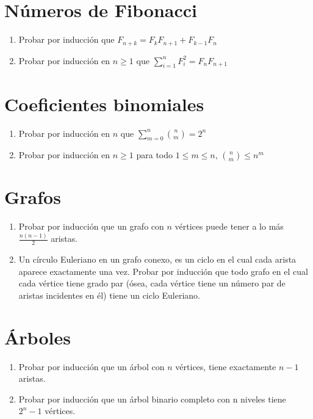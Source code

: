 \documentclass{article}
\begin{document}
\section{Números de Fibonacci} 

\begin{enumerate}
  \item Probar por inducción que $F_{n+k}=F_{k}F_{n+1}+F_{k-1}F_{n}$
  
  \item Probar por inducción en $n\geq 1$ que $\sum_{i=1}^{n}F_i^2=F_{n}F_{n+1}$
  
\end{enumerate}

\section{Coeficientes binomiales}

\begin{enumerate}
  \item Probar por inducción en $n$ que \(\sum_{m=0}^{n}{n \choose m}=2^n\)

  \item Probar por inducción en $n\geq1$ para todo $1\leq m\leq n$,
  \( {n \choose m} \leq n^m \)
\end{enumerate}


\section{Grafos}

\begin{enumerate}
  \item Probar por inducción que un grafo con $n$ vértices puede tener a lo más $\frac{n(n-1)}{2}$ aristas.
  
  \item Un círculo Euleriano en un grafo conexo, es un ciclo en el cual cada arista aparece exactamente una vez. Probar por inducción que todo grafo en el cual cada vértice tiene grado par (ósea, cada vértice tiene un número par de aristas incidentes en él) tiene un ciclo Euleriano.
\end{enumerate}


\section{Árboles}

\begin{enumerate}
  \item Probar por inducción que un árbol con $n$ vértices, tiene exactamente $n-1$ aristas.
  
  \item Probar por inducción que un árbol binario completo con n
niveles tiene $2^n-1$ vértices.
\end{enumerate}
\end{document}

